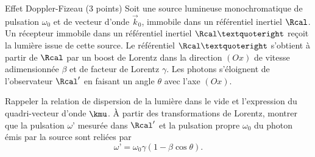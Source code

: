 
\begin{exo}[PC][1][devoir]{Effet Doppler-Fizeau (3 points)}
  Soit une source lumineuse monochromatique de pulsation $\omega_0$ et de vecteur d’onde $\Vec{k}_0$, immobile dans un référentiel inertiel $\Rcal$. Un récepteur immobile dans un référentiel inertiel $\Rcal’$ reçoit la lumière issue de cette source. Le référentiel $\Rcal’$ s’obtient à partir de $\Rcal$ par un boost de Lorentz dans la direction $(Ox)$ de vitesse adimensionnée $\beta$ et de facteur de Lorentz $\gamma$. Les photons s'éloignent de l'observateur $\Rcal'$ en faisant un angle $\theta$ avec l'axe $(Ox)$.
  \begin{quest}
    \item	Rappeler la relation de dispersion de la lumière dans le vide et l'expression du quadri-vecteur d’onde $\kmu$. À partir des transformations de Lorentz, montrer que la pulsation $\omega’$ mesurée dans $\Rcal'$ et la pulsation propre $\omega_0$ du photon émis par la source sont reliées par
    \begin{equation}
      {\omega’} = {{\omega_0}}{\gamma(1-\beta \cos \theta)}.
    \end{equation}


\end{quest}
\end{exo}
